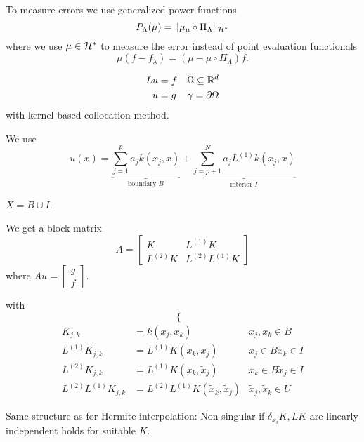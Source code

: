 To measure errors we use generalized power functions 
\[P_\Lambda(\mu)=\Vert\mu_\mu\circ\Pi_\Lambda\Vert_{\mathcal{H}^*}\]
where we use $\mu\in\mathcal{H}^*$ to measure the error instead of 
point evaluation functionals
\[\mu(f-f_\lambda)=(\mu-\mu\circ\Pi_\Lambda)f.\]

\begin{eqnarray*}
    Lu&=f & \Omega\subseteq\mathbb{R}^d\\
    u&=g&\gamma=\partial\Omega
\end{eqnarray*}
with kernel based collocation method. 

We use 
\begin{equation}\label{eq:010}
    u(x)=\underbrace{\sum_{j=1}^p a_j k(x_j,x)}_{\text{boundary } B}+\underbrace{\sum_{j=p+1}^N a_j L^{(1)}k(x_j,x)}_{\text{interior }I}
\end{equation}

$X=B\cup I$.

We get a block matrix 
\[A=\begin{bmatrix}
    K & L^{(1)}K\\
    L^{(2)}K & L^{(2)}L^{(1)}K 
\end{bmatrix}\]
where $Au=\begin{bmatrix}
    g\\f
\end{bmatrix}.$

with 
\[\begin{cases}
    \\
    
\end{cases}  \]
\begin{eqnarray*}
    K_{j,k} &= k(x_j,x_k) & x_j,x_k\in B\\
    L^{(1)}K_{j,k} &=L^{(1)}K(\tilde{x}_k,x_j)&x_j\in B \tilde{x}_k\in I \\
    L^{(2)}K_{j,k} &=L^{(1)}K(x_k,\tilde{x}_j)&x_k\in B \tilde{x}_j\in I \\
    L^{(2)}L^{(1)}K_{j,k} &= L^{(2)}L^{(1)}K(\tilde{x}_k,\tilde{x}_j) & \tilde{x}_j,\tilde{x}_k\in U
\end{eqnarray*}

Same structure as for Hermite interpolation: Non-singular if 
$\delta_{x_i}K,LK$ are linearly independent holds for suitable $K$. %

